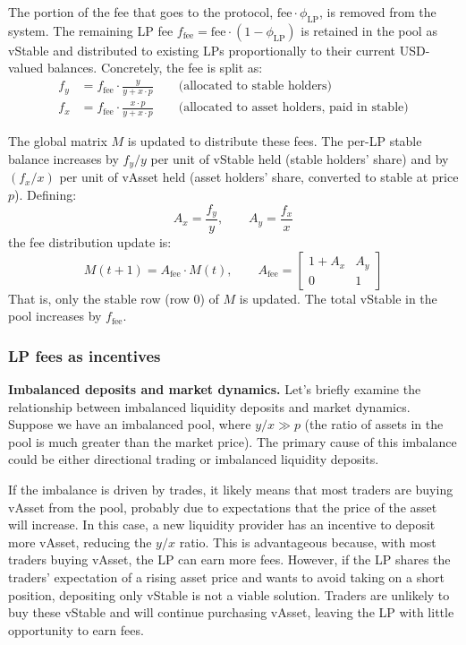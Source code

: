 \documentclass{article}
\begin{document}
\medskip
The portion of the fee that goes to the protocol, $\mathrm{fee} \cdot \phi_{\mathrm{LP}}$,
is removed from the system. The remaining LP fee
$f_{\mathrm{fee}} = \mathrm{fee} \cdot (1 - \phi_{\mathrm{LP}})$ is retained in the pool
as vStable and distributed to existing LPs proportionally to their current USD-valued
balances. Concretely, the fee is split as:
\begin{align}
f_y &= f_{\mathrm{fee}} \cdot \frac{y}{y + x \cdot p} \qquad \text{(allocated to stable holders)}\\
f_x &= f_{\mathrm{fee}} \cdot \frac{x \cdot p}{y + x \cdot p} \qquad \text{(allocated to asset holders, paid in stable)}
\end{align}

The global matrix $M$ is updated to distribute these fees. The per-LP stable balance
increases by $f_y/y$ per unit of vStable held (stable holders' share) and by
$(f_x/x)$ per unit of vAsset held (asset holders' share, converted to stable at price
$p$). Defining:
\begin{equation}
A_x = \frac{f_y}{y}, \qquad A_y = \frac{f_x}{x}
\end{equation}
the fee distribution update is:
\begin{equation}
M(t+1) = A_{\mathrm{fee}} \cdot M(t), \qquad
A_{\mathrm{fee}} = \begin{bmatrix} 1 + A_x & A_y \\ 0 & 1 \end{bmatrix}
\end{equation}
That is, only the stable row (row 0) of $M$ is updated. The total vStable in the pool
increases by $f_{\mathrm{fee}}$.

\subsubsection{LP fees as incentives}

\noindent\textbf{Imbalanced deposits and market dynamics.} Let's briefly examine the
relationship between imbalanced liquidity deposits and market dynamics. Suppose we have an
imbalanced pool, where $y/x \gg p$ (the ratio of assets in the pool is much greater than
the market price). The primary cause of this imbalance could be either directional trading
or imbalanced liquidity deposits.

If the imbalance is driven by trades, it likely means that most traders are buying vAsset
from the pool, probably due to expectations that the price of the asset will increase. In
this case, a new liquidity provider has an incentive to deposit more vAsset, reducing the
$y/x$ ratio. This is advantageous because, with most traders buying vAsset, the LP can
earn more fees. However, if the LP shares the traders' expectation of a rising asset price
and wants to avoid taking on a short position, depositing only vStable is not a viable
solution. Traders are unlikely to buy these vStable and will continue purchasing vAsset,
leaving the LP with little opportunity to earn fees.
\end{document}
